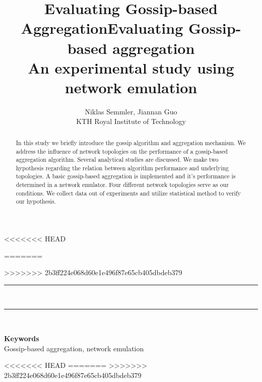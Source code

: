 \documentclass[11pt,a4paper]{article}
\date{}
\def\keywords#1{\begin{center}{\bf Keywords}\\{#1}\end{center}} %
\def\titulo#1{\title{#1}} %
\begin{document}
<<<<<<< HEAD
\titulo{Evaluating Gossip-based Aggregation}
%
=======
\title{Evaluating Gossip-based aggregation\\An experimental study using network emulation}

>>>>>>> 2b3ff224e068d60e1e496f87e65cb405dbdeb379
\author{
Niklas Semmler, Jiannan Guo\\
KTH Royal Institute of Technology\\
}%
%
\maketitle
\newcommand{\HRule}{\rule{\linewidth}{0.5mm}}
\HRule \\[0.4cm]
\begin{abstract}
In this study we briefly introduce the gossip algorithm and aggregation mechanism. We address the influence of network topologies on the performance of a gossip-based aggregation algorithm. Several analytical studies are discussed. We make two hypothesis regarding the relation between algorithm performance and underlying topologies. A basic gossip-based aggregation is implemented and it's performance is determined in a network emulator. Four different network topologies serve as our conditions. We collect data out of experiments and utilize statistical method to verify our hypothesis.
\end{abstract}
\HRule \\[0.4cm]

\keywords{Gossip-based aggregation, network emulation}%

<<<<<<< HEAD
=======
\newpage
\tableofcontents
\newpage
>>>>>>> 2b3ff224e068d60e1e496f87e65cb405dbdeb379








\newpage




\appendix
\end{document}
